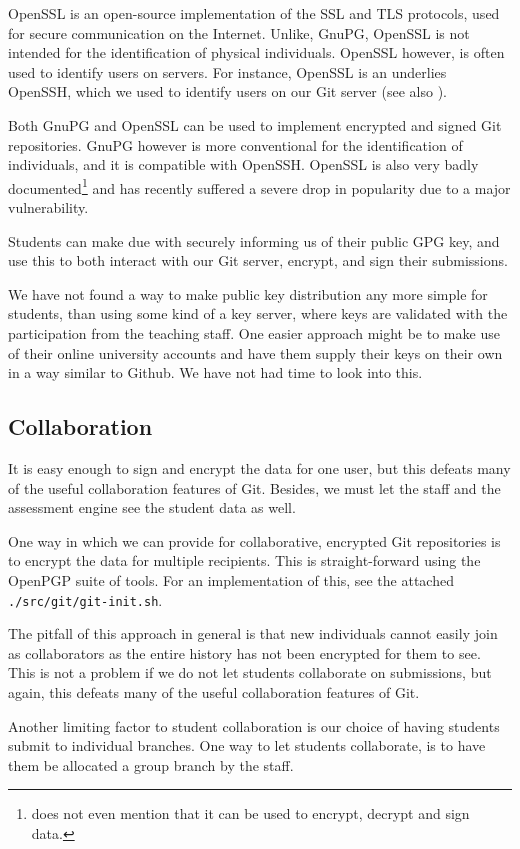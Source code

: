 OpenSSL is an open-source implementation of the SSL and TLS protocols, used for
secure communication on the Internet. Unlike, GnuPG, OpenSSL is not intended
for the identification of physical individuals. OpenSSL however, is often used
to identify users on servers. For instance, OpenSSL is an underlies OpenSSH,
which we used to identify users on our Git server (see also
).

Both GnuPG and OpenSSL can be used to implement encrypted and signed Git
repositories. GnuPG however is more conventional for the identification of
individuals, and it is compatible with OpenSSH\cite{man-1-gpg-agent}. OpenSSL
is also very badly documented\footnote{\cite{man-1-openssl} does not even
mention that it can be used to encrypt, decrypt and sign data.} and has
recently suffered a severe drop in popularity due to a major
vulnerability\cite{cvedetails-com-2014c}.

Students can make due with securely informing us of their public GPG key, and
use this to both interact with our Git server, encrypt, and sign their
submissions.

We have not found a way to make public key distribution any more simple for
students, than using some kind of a key server, where keys are validated with
the participation from the teaching staff. One easier approach might be to make
use of their online university accounts and have them supply their keys on
their own in a way similar to Github. We have not had time to look into this.

\subsection{Collaboration}

It is easy enough to sign and encrypt the data for one user, but this defeats
many of the useful collaboration features of Git. Besides, we must let the
staff and the assessment engine see the student data as well.

One way in which we can provide for collaborative, encrypted Git repositories
is to encrypt the data for multiple recipients. This is straight-forward using
the OpenPGP suite of tools\cite{man-1-gpg2}. For an implementation of this, see
the attached \texttt{./src/git/git-init.sh}.

The pitfall of this approach in general is that new individuals cannot easily
join as collaborators as the entire history has not been encrypted for them to
see.  This is not a problem if we do not let students collaborate on
submissions, but again, this defeats many of the useful collaboration features
of Git.


Another limiting factor to student collaboration is our choice of having
students submit to individual branches. One way to let students collaborate, is
to have them be allocated a group branch by the staff.

